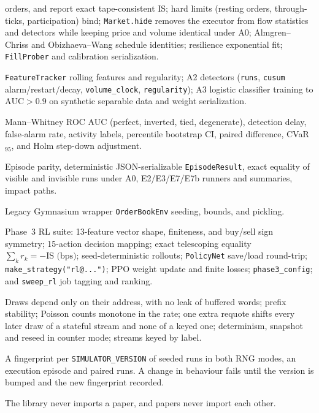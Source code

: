 \documentclass[11pt,a4paper]{article}
\newcommand{\code}[1]{\texttt{#1}}
\begin{document}
\begin{description}[nosep]
  orders, and report exact tape-consistent IS; hard limits (resting orders, through-ticks, participation)
  bind; \code{Market.hide} removes the executor from flow statistics and detectors while keeping price
  and volume identical under A0; Almgren--Chriss and Obizhaeva--Wang schedule identities; resilience
  exponential fit; \code{FillProber} and calibration serialization.
\item[\code{test\_detectors.py}] \code{FeatureTracker} rolling features and regularity; A2 detectors
  (\code{runs}, \code{cusum} alarm/restart/decay, \code{volume\_clock}, \code{regularity}); A3 logistic
  classifier training to $\text{AUC} > 0.9$ on synthetic separable data and weight serialization.
\item[\code{test\_scoring.py}] Mann--Whitney ROC AUC (perfect, inverted, tied, degenerate), detection
  delay, false-alarm rate, activity labels, percentile bootstrap CI, paired difference, CVaR$_{95}$, and
  Holm step-down adjustment.
\item[\code{test\_experiments.py} (\code{papers/stealth\_execution/tests/})] Episode parity, deterministic JSON-serializable \code{EpisodeResult},
  exact equality of visible and invisible runs under A0, E2/E3/E7/E7b runners and summaries, impact paths.
\item[\code{test\_env.py}] Legacy Gymnasium wrapper \code{OrderBookEnv} seeding, bounds, and pickling.
\item[\code{test\_rl.py}] Phase~3 RL suite: 13-feature vector shape, finiteness, and buy/sell sign
  symmetry; 15-action decision mapping; exact telescoping equality $\sum_k r_k = -\text{IS (bps)}$;
  seed-deterministic rollouts; \code{PolicyNet} save/load round-trip; \code{make\_strategy("rl@...")};
  PPO weight update and finite losses; \code{phase3\_config}; and \code{sweep\_rl} job tagging and ranking.
\item[\code{test\_rng.py}] Draws depend only on their address, with no leak of buffered words; prefix stability; Poisson counts monotone in the rate; one extra requote shifts every later draw of a stateful stream and none of a keyed one; determinism, snapshot and reseed in counter mode; streams keyed by label.
\item[\code{test\_simulator\_version.py}] A fingerprint per \code{SIMULATOR\_VERSION} of seeded runs in both RNG modes, an execution episode and paired runs. A change in behaviour fails until the version is bumped and the new fingerprint recorded.
\item[\code{test\_layout.py}] The library never imports a paper, and papers never import each other.

\end{description}
\end{document}
